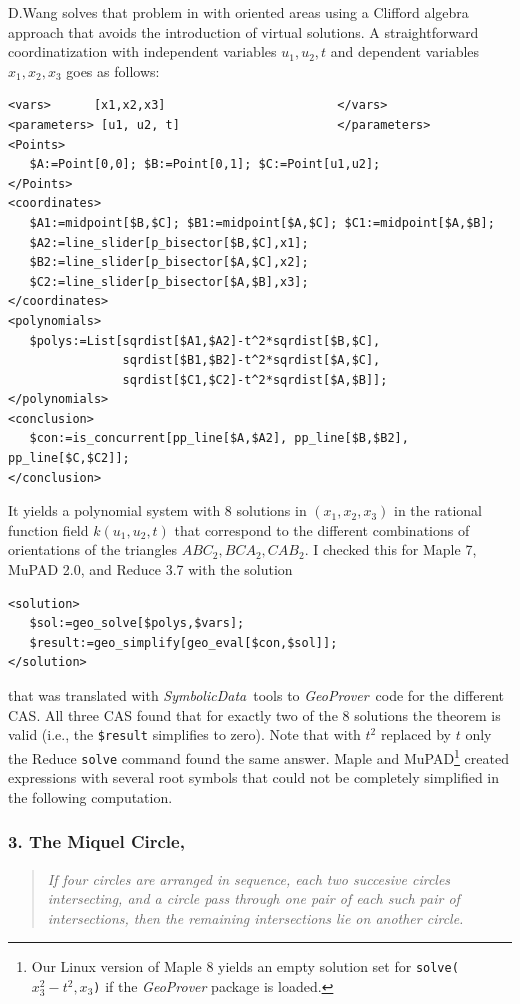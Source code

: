 \documentclass[11pt]{article}
\newcommand{\GP}{\textit{Geo\-Prover}}
\newcommand{\SD}{\textit{Symbolic\-Data}}
\begin{document}
D.Wang solves that problem in \cite{Wang_97a} with oriented areas using a
Clifford algebra approach that avoids the introduction of virtual solutions. A
straightforward coordinatization with independent variables $u_1, u_2, t$ and
dependent variables $x_1, x_2, x_3$ goes as follows:
\begin{verbatim}
<vars>      [x1,x2,x3]                        </vars>
<parameters> [u1, u2, t]                      </parameters>
<Points>
   $A:=Point[0,0]; $B:=Point[0,1]; $C:=Point[u1,u2];
</Points>
<coordinates> 
   $A1:=midpoint[$B,$C]; $B1:=midpoint[$A,$C]; $C1:=midpoint[$A,$B];
   $A2:=line_slider[p_bisector[$B,$C],x1];
   $B2:=line_slider[p_bisector[$A,$C],x2];
   $C2:=line_slider[p_bisector[$A,$B],x3];
</coordinates>
<polynomials>
   $polys:=List[sqrdist[$A1,$A2]-t^2*sqrdist[$B,$C],
                sqrdist[$B1,$B2]-t^2*sqrdist[$A,$C], 
                sqrdist[$C1,$C2]-t^2*sqrdist[$A,$B]];
</polynomials>
<conclusion>
   $con:=is_concurrent[pp_line[$A,$A2], pp_line[$B,$B2], pp_line[$C,$C2]];
</conclusion>
\end{verbatim}%
It yields a polynomial system with 8 solutions in $(x_1,x_2,x_3)$ in the
rational function field $k(u_1, u_2, t)$ that correspond to the different
combinations of orientations of the triangles $ABC_2, BCA_2, CAB_2$.  I
checked this for Maple 7, MuPAD 2.0, and Reduce 3.7 with the solution
\begin{verbatim}
<solution>
   $sol:=geo_solve[$polys,$vars];
   $result:=geo_simplify[geo_eval[$con,$sol]];
</solution>
\end{verbatim}
that was translated with \SD\ tools to \GP\ code for the different CAS. All
three CAS found that for exactly two of the 8 solutions the theorem is valid
(i.e., the {\tt \$result} simplifies to zero).  Note that with $t^2$ replaced
by $t$ only the Reduce {\tt solve} command found the same answer. Maple and
MuPAD\footnote{Our Linux version of Maple 8 yields an empty solution set for
  {\tt solve($x_3^2-t^2,x_3$)} if the {\GP} package is loaded. } created
expressions with several root symbols that could not be completely simplified
in the following computation.

\subsubsection*{3. The Miquel Circle, \cite[Ex.~5]{Li_99a}} 

\begin{quote}\it If four circles are arranged in sequence, each two succesive
  circles intersecting, and a circle pass through one pair of each such pair
  of intersections, then the remaining intersections lie on another circle.
\end{quote}
\end{document}
